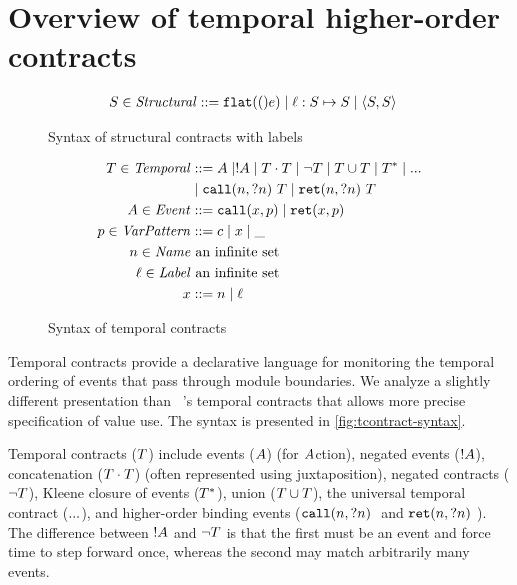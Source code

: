 \documentclass[preprint,onecolumn,9pt]{sigplanconf} %
\begin{document}
\section{Overview of temporal higher-order contracts}

\begin{figure}
  \begin{align*}
    S \in \mathit{Structural} &::= {\tt flat}(()e) \mid \ell : S \mapsto S \mid \langle S, S \rangle
  \end{align*}
  \caption{Syntax of structural contracts with labels}
  \label{fig:scontract-syntax}
\end{figure}

\begin{figure}
  \begin{align*}
 T \in \mathit{Temporal} &::=
      A \mid ! A
 \mid T \cdot T
 \mid \neg T
 \mid T \cup T
 \mid T^*
 \mid {\tt ...} \\
&\mid {\tt call}(n, {\tt ?}n)\ T
 \mid {\tt ret}(n, {\tt ?}n)\ T \\
A \in \mathit{Event} &::= {\tt call}(x, p) \mid {\tt ret}(x, p) \\
p \in \mathit{VarPattern} &::= c \mid x \mid \_ \\
n \in \mathit{Name} &\text{ an infinite set} \\
\ell \in \mathit{Label}&\text{ an infinite set} \\
x &::= n \mid \ell
  \end{align*}
  \caption{Syntax of temporal contracts}
  \label{fig:tcontract-syntax}
\end{figure}

Temporal contracts provide a declarative language for monitoring the temporal ordering of events that pass through module boundaries.
%
We analyze a slightly different presentation than ~\citep{ianjohnson:dfm:icfp2011}'s temporal contracts that allows more precise specification of value use.
%
The syntax is presented in \autoref{fig:tcontract-syntax}.

Temporal contracts ($T$) include events ($A$) (for $A$ction), negated events ($! A$), concatenation ($T \cdot T$) (often represented using juxtaposition), negated contracts ($\neg T$), Kleene closure of events ($T^*$), union ($T \cup T$), the universal temporal contract (${\tt ...}$), and higher-order binding events ($\stcall{\mname}{\mname}$ and $\stret{\mname}{\mname}$).
%
The difference between $! A$ and $\neg T$ is that the first must be an event and force time to step forward once, whereas the second may match arbitrarily many events.
\end{document}

